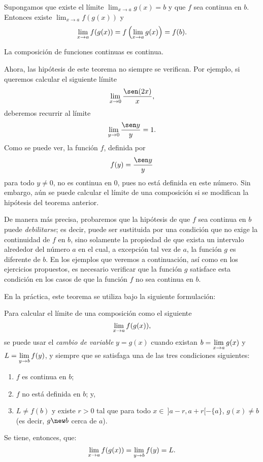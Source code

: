 \begin{teocal}
Supongamos que existe el límite $\displaystyle\lim_{x\to a}g(x)= b$ y que $f$ sea continua en $b$. Entonces
existe $\displaystyle\lim_{x\to a}f(g(x))$ y
\[
\lim_{x\to a}f(g(x)) = f\left(\limjc{g(x)}{x}{a}\right) = f(b).
\]
\end{teocal}%

\begin{corocal}[]
La composición de funciones continuas es continua.
\end{corocal}


Ahora, las hipótesis de este teorema no siempre se verifican. Por ejemplo, si queremos calcular
el siguiente límite
\[
\limjc{\frac{\sen(2x)}{x}}{x}{0},
\]
deberemos recurrir al límite
\[
\limjc{\frac{\sen y}{y}}{y}{0} = 1.
\]
Como se puede ver, la función $f$, definida por
\[
f(y) = \frac{\sen y}{y}
\]
para todo $y\neq 0$, no es continua en $0$, pues no está definida en este número. Sin embargo, aún
se puede calcular el límite de una composición si se modifican la hipótesis del teorema anterior.

De manera más precisa, probaremos que la hipótesis de que $f$ sea continua en $b$ puede
\emph{debilitarse}; es decir, puede ser sustituida por una condición que no exige la continuidad de
$f$ en $b$, sino solamente la propiedad de que exista un intervalo alrededor del número $a$ en el
cual, a excepción tal vez de $a$, la función $g$ es diferente de $b$. En los ejemplos que veremos a
continuación, así como en los ejercicios propuestos, es necesario verificar que la función $g$
satisface esta condición en los casos de que la función $f$ no sea continua en $b$.

En la práctica, este teorema se utiliza bajo la siguiente formulación:

\begin{teocal}\label{teo:LimCambioVariable}%
Para calcular el límite de una composición como el siguiente
\[
\limjc{f(g(x))}{x}{a},
\]
se puede usar el \emph{cambio de variable}
$
y = g(x)
$
cuando existan $\displaystyle b = \limjc{g(x)}{x}{a}$ y $\displaystyle L = \limjc{f(y)}{y}{b}$, y siempre que se satisfaga una de las tres condiciones siguientes:
\begin{enumerate}
\item $f$ es continua en $b$;
\item $f$ no está definida en $b$; y,
\item $L \neq f(b)$ y existe $r > 0$ tal que para todo $x \in\ ]a-r,a+r[-\{a\}$, $g(x) \neq b$ (es decir, $g\new b$ cerca de $a$).
\end{enumerate}
Se tiene, entonces, que:
\[
\limjc{f(g(x))}{x}{a} = \limjc{f(y)}{y}{b} = L.
\]
\end{teocal}

